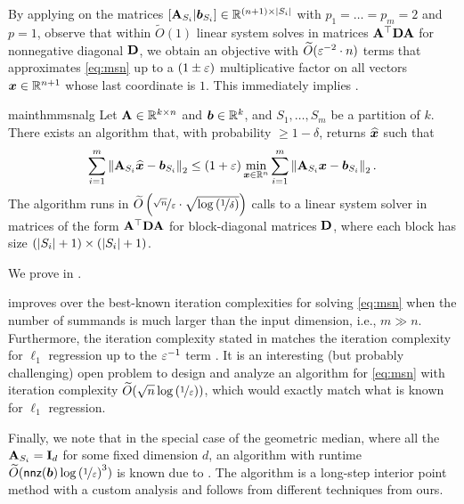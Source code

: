 \documentclass[11pt]{article}
\numberwithin{equation}{section}
\begin{document}
By applying  on the matrices $\left[\mathbf{A}_{S_i} \vert \bm{b}_{S_i}\right] \in \mathbb{R}^{(n+1) \times \left\lvert S_i \right\rvert}$ with $p_1=\dots=p_m=2$ and $p=1$, observe that within $\widetilde{O}(1)$ linear system solves in matrices $\mathbf{A}^{\top}\mathbf{D}\mathbf{A}$ for nonnegative diagonal $\mathbf{D}$, we obtain an objective with $\widetilde{O}(\varepsilon^{-2} \cdot n)$ terms that approximates \eqref{eq:msn} up to a $(1\pm\varepsilon)$ multiplicative factor on all vectors $\bm{x} \in \mathbb{R}^{n+1}$ whose last coordinate is $1$. This immediately implies .

\begin{restatable}{mainthm}{msnalg}
\label{thm:msnalg}
Let $\mathbf{A} \in \mathbb{R}^{k \times n}$ and \(\bm{b} \in \mathbb{R}^k\), and $S_1, \dots, S_m$ be a partition of $k$. There exists an algorithm that, with probability $\ge 1-\delta$, returns $\widehat{\bm{x}}$ such that
\begin{align*}
    \sum_{i=1}^m \left\lVert \mathbf{A}_{S_i}\widehat{\bm{x}}-\bm{b}_{S_i} \right\rVert_2 \le (1+\varepsilon)\min_{\bm{x}\in\mathbb{R}^n} \sum_{i=1}^m \left\lVert \mathbf{A}_{S_i} \bm{x}-\bm{b}_{S_i} \right\rVert_2.
\end{align*}
The algorithm runs in $\widetilde{O}\left(\nicefrac{\sqrt{n}}{\varepsilon} \cdot \sqrt{\log\left(\nicefrac{1}{\delta}\right)}\right)$ calls to a linear system solver in matrices of the form $\mathbf{A}^{\top}\mathbf{D}\mathbf{A}$ for block-diagonal matrices $\mathbf{D}$, where each block has size $(\left\lvert S_i \right\rvert+1) \times (\left\lvert S_i \right\rvert+1)$.
\end{restatable}

We prove  in .

 improves over the best-known iteration complexities for solving \eqref{eq:msn} when the number of summands is much larger than the input dimension, i.e., $m \gg n$. Furthermore, the iteration complexity stated in  matches the iteration complexity for $\ell_1$ regression up to the $\varepsilon^{-1}$ term \cite{bllssw21}. It is an interesting (but probably challenging) open problem to design and analyze an algorithm for \eqref{eq:msn} with iteration complexity $\widetilde{O}(\sqrt{n}\log\left(\nicefrac{1}{\varepsilon}\right))$, which would exactly match what is known for $\ell_1$ regression.

Finally, we note that in the special case of the geometric median, where all the $\mathbf{A}_{S_i} = \mathbf{I}_d$ for some fixed dimension \(d\), an algorithm with runtime $\widetilde{O}(\mathsf{nnz}(\bm{b})\log\left(\nicefrac{1}{\varepsilon}\right)^3)$ is known due to \citet{clmps16}. The algorithm is a long-step interior point method with a custom analysis and follows from different techniques from ours.
\end{document}
